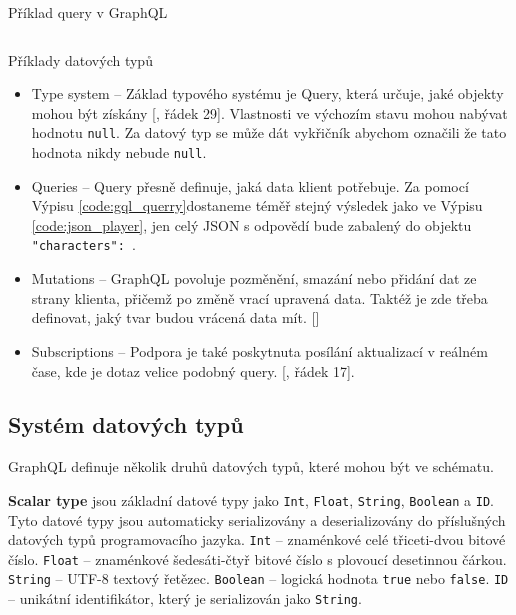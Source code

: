 \begin{listing}[ht!]
    \inputminted[]{graphql}{resources/code//standards/playerquery.gql}
    \caption{Příklad query v GraphQL}
    \label{code:gql_querry}
\end{listing}


\begin{listing}[ht!]
    \inputminted[]{graphql}{resources/code/standards/types.example.gql}
    \caption{Příklady datových typů}
    \label{code:gql_datatypes}
\end{listing}

\begin{itemize}
    \item Type system  -- Základ typového systému je Query, která určuje, jaké objekty mohou být získány [, řádek 29]. Vlastnosti ve výchozím stavu mohou nabývat hodnotu \texttt{null}. Za datový typ se může dát vykřičník abychom označili že tato hodnota nikdy nebude \texttt{null}.
    \item Queries  -- Query přesně definuje, jaká data klient potřebuje. Za pomocí Výpisu \ref{code:gql_querry}dostaneme téměř stejný výsledek jako ve Výpisu \ref{code:json_player}, jen celý JSON s odpovědí bude zabalený do objektu \texttt{"characters": {}}.
    \item Mutations  -- GraphQL povoluje pozměnění, smazání nebo přidání dat ze strany klienta, přičemž po změně vrací upravená data. Taktéž je zde třeba definovat, jaký tvar budou vrácená data mít. []
    \item Subscriptions  -- Podpora je také poskytnuta posílání aktualizací v reálném čase, kde je dotaz velice podobný query. [, řádek 17].
\end{itemize}

\subsection{Systém datových typů}\label{sec:graphql:datatypes}
GraphQL definuje několik druhů datových typů, které mohou být ve schématu.

\textbf{Scalar type} jsou základní datové typy jako \texttt{Int}, \texttt{Float}, \texttt{String}, \texttt{Boolean} a \texttt{ID}. Tyto datové typy jsou automaticky serializovány a deserializovány do příslušných datových typů programovacího jazyka.
\texttt{Int} -- znaménkové celé třiceti-dvou bitové číslo.
\texttt{Float} -- znaménkové šedesáti-čtyř bitové číslo s plovoucí desetinnou čárkou.
\texttt{String} -- UTF-8 textový řetězec.
\texttt{Boolean} -- logická hodnota \texttt{true} nebo \texttt{false}.
\texttt{ID} -- unikátní identifikátor, který je serializován jako \texttt{String}.

